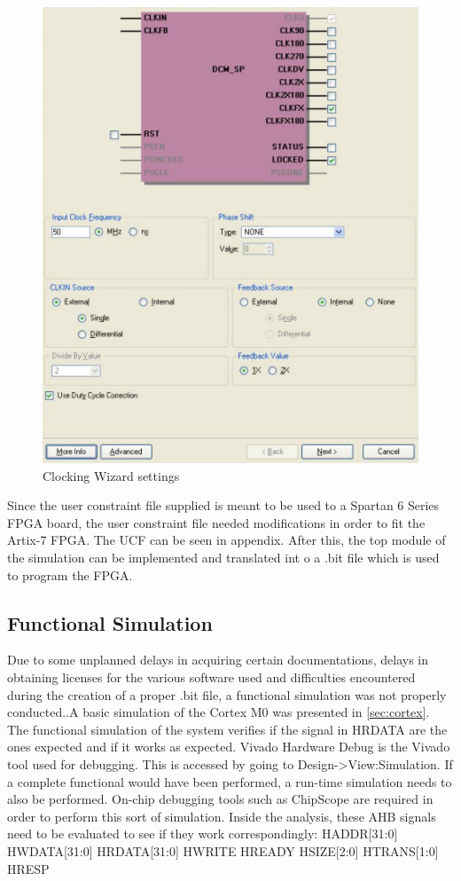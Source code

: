 \begin{figure}
\centering
\includegraphics[scale=0.7]{figures/clock_creation.PNG}
\caption{Clocking Wizard settings } 
\label{fig:clock}
\end{figure}

Since the user constraint file supplied is meant to be used to a Spartan 6 Series FPGA board, the user constraint file needed modifications in order to fit the Artix-7 FPGA. The UCF can be seen in appendix. After this, the top module of the simulation can be implemented and translated int o a .bit file which is used to program the FPGA.

\subsection{Functional Simulation}
Due to some unplanned delays in acquiring certain documentations, delays in obtaining licenses for the various software used and difficulties encountered during the creation of a proper .bit file, a functional simulation was not properly conducted..A basic simulation of the Cortex M0 was presented in \ref{sec:cortex}.  The functional simulation of the system verifies if the signal in HRDATA are the ones expected and if it works as expected. Vivado Hardware Debug is the Vivado tool used for debugging. This is accessed by going to Design->View:Simulation. If a complete functional would have been performed, a run-time simulation needs to also be performed. On-chip debugging tools such as ChipScope are required in order to perform this sort of simulation. Inside the analysis, these AHB signals need to be evaluated to see if they work correspondingly: 
HADDR[31:0] 
HWDATA[31:0]
HRDATA[31:0]
HWRITE
HREADY
HSIZE[2:0]
HTRANS[1:0]
HRESP

